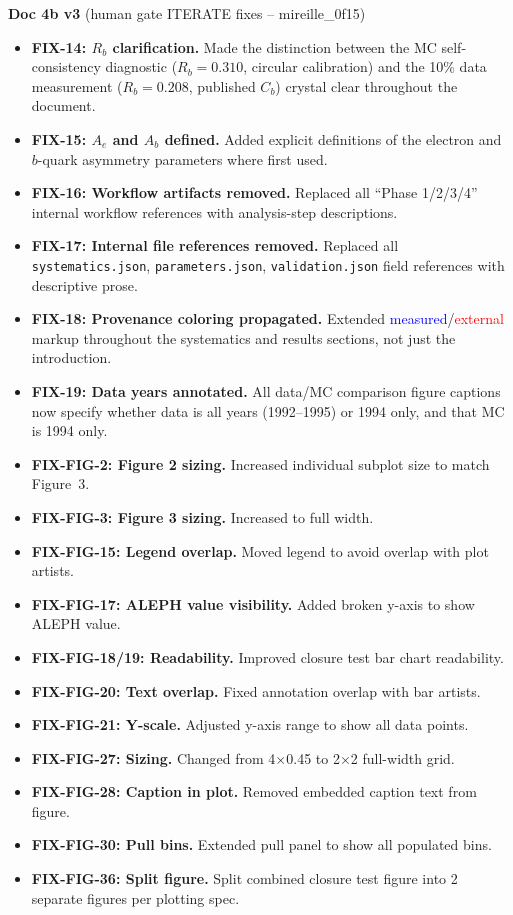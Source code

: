 \documentclass[11pt,a4paper]{article}
\newcommand{\measured}[1]{\textcolor{blue}{#1}}
\newcommand{\external}[1]{\textcolor{red}{#1}}
\begin{document}
\textbf{Doc 4b v3} (human gate ITERATE fixes -- mireille\_0f15)
\begin{itemize}
\item \textbf{FIX-14: $R_b$ clarification.} Made the distinction between the MC self-consistency
  diagnostic ($R_b = 0.310$, circular calibration) and the 10\% data measurement
  ($R_b = 0.208$, published $C_b$) crystal clear throughout the document.
\item \textbf{FIX-15: $A_e$ and $A_b$ defined.} Added explicit definitions of the
  electron and $b$-quark asymmetry parameters where first used.
\item \textbf{FIX-16: Workflow artifacts removed.} Replaced all ``Phase 1/2/3/4''
  internal workflow references with analysis-step descriptions.
\item \textbf{FIX-17: Internal file references removed.} Replaced all
  \texttt{systematics.json}, \texttt{parameters.json}, \texttt{validation.json}
  field references with descriptive prose.
\item \textbf{FIX-18: Provenance coloring propagated.} Extended
  \measured{measured}/\external{external} markup throughout the systematics and
  results sections, not just the introduction.
\item \textbf{FIX-19: Data years annotated.} All data/MC comparison figure captions
  now specify whether data is all years (1992--1995) or 1994 only, and that MC is
  1994 only.
\item \textbf{FIX-FIG-2: Figure 2 sizing.} Increased individual subplot size to match Figure~3.
\item \textbf{FIX-FIG-3: Figure 3 sizing.} Increased to full width.
\item \textbf{FIX-FIG-15: Legend overlap.} Moved legend to avoid overlap with plot artists.
\item \textbf{FIX-FIG-17: ALEPH value visibility.} Added broken y-axis to show ALEPH value.
\item \textbf{FIX-FIG-18/19: Readability.} Improved closure test bar chart readability.
\item \textbf{FIX-FIG-20: Text overlap.} Fixed annotation overlap with bar artists.
\item \textbf{FIX-FIG-21: Y-scale.} Adjusted y-axis range to show all data points.
\item \textbf{FIX-FIG-27: Sizing.} Changed from 4$\times$0.45 to 2$\times$2 full-width grid.
\item \textbf{FIX-FIG-28: Caption in plot.} Removed embedded caption text from figure.
\item \textbf{FIX-FIG-30: Pull bins.} Extended pull panel to show all populated bins.
\item \textbf{FIX-FIG-36: Split figure.} Split combined closure test figure into 2 separate figures per plotting spec.
\end{itemize}
\end{document}
